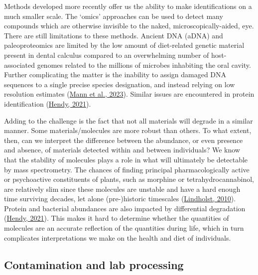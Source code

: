 \documentclass[
  letterpaper,
]{book}
\begin{document}
Methods developed more recently offer us the ability to make
identifications on a much smaller scale. The `omics' approaches can be
used to detect many compounds which are otherwise invisible to the
naked, microscopically-aided, eye. There are still limitations to these
methods. Ancient DNA (aDNA) and paleoproteomics are limited by the low
amount of diet-related genetic material present in dental calculus
compared to an overwhelming number of host-associated genomes related to
the millions of microbes inhabiting the oral cavity. Further
complicating the matter is the inability to assign damaged DNA sequences
to a single precise species designation, and instead relying on low
resolution estimates (\protect\hyperlink{ref-mannHaveSomething2023}{Mann
et al., 2023}). Similar issues are encountered in protein identification
(\protect\hyperlink{ref-hendyAncientProtein2021}{Hendy, 2021}).

Adding to the challenge is the fact that not all materials will degrade
in a similar manner. Some materials/molecules are more robust than
others. To what extent, then, can we interpret the difference between
the abundance, or even presence and absence, of materials detected
within and between individuals? We know that the stability of molecules
plays a role in what will ultimately be detectable by mass spectrometry.
The chances of finding principal pharmacologically active or
psychoactive constituents of plants, such as morphine or
tetrahydrocannabinol, are relatively slim since these molecules are
unstable and have a hard enough time surviving decades, let alone
(pre-)historic timescales
(\protect\hyperlink{ref-lindholstLongTerm2010}{Lindholst, 2010}).
Protein and bacterial abundances are also impacted by differential
degradation (\protect\hyperlink{ref-hendyAncientProtein2021}{Hendy,
2021}). This makes it hard to determine whether the quantities of
molecules are an accurate reflection of the quantities during life,
which in turn complicates interpretations we make on the health and diet
of individuals.

\hypertarget{contamination-and-lab-processing}{%
\subsection{Contamination and lab
processing}\label{contamination-and-lab-processing}}
\end{document}
